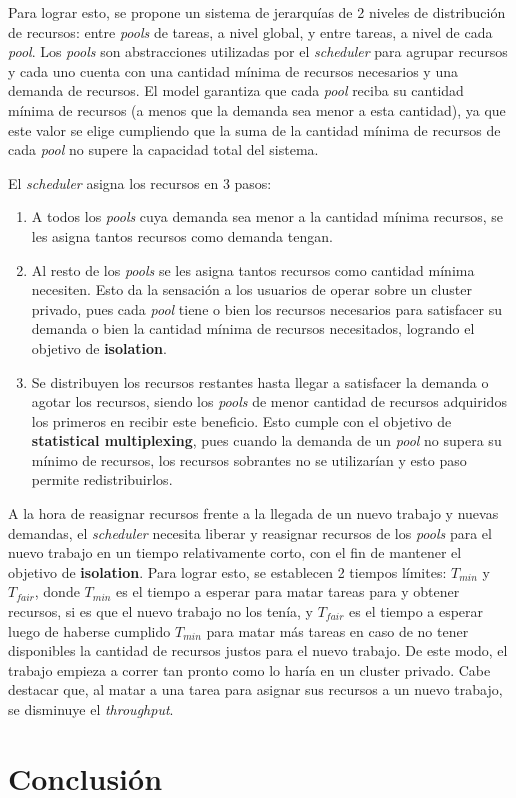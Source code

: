 \documentclass[a4paper]{article}
\begin{document}
Para lograr esto, se propone un sistema de jerarquías de 2 niveles de
distribución de recursos: entre \textit{pools} de tareas, a nivel global, y
entre tareas, a nivel de cada \textit{pool}. Los \textit{pools} son
abstracciones utilizadas por el \textit{scheduler} para agrupar recursos y cada
uno cuenta con una cantidad mínima de recursos necesarios y una demanda de
recursos. El model garantiza que cada \textit{pool} reciba su cantidad mínima
de recursos (a menos que la demanda sea menor a esta cantidad), ya que este
valor se elige cumpliendo que la suma de la cantidad mínima de recursos de cada
\textit{pool} no supere la capacidad total del sistema.

El \textit{scheduler} asigna los recursos en 3 pasos:
\begin{enumerate}
	\item A todos los \textit{pools} cuya demanda sea menor a la cantidad mínima
  recursos, se les asigna tantos recursos como demanda tengan.
	\item Al resto de los \textit{pools} se les asigna tantos recursos como
  cantidad mínima necesiten. Esto da la sensación a los usuarios de operar
  sobre un cluster privado, pues cada \textit{pool} tiene o bien los recursos
  necesarios para satisfacer su demanda o bien la cantidad mínima de recursos
  necesitados, logrando el objetivo de \textbf{isolation}.
	\item Se distribuyen los recursos restantes hasta llegar a satisfacer la
  demanda o agotar los recursos, siendo los \textit{pools} de menor cantidad de
  recursos adquiridos los primeros en recibir este beneficio. Esto cumple con
  el objetivo de \textbf{statistical multiplexing}, pues cuando la demanda de
  un \textit{pool} no supera su mínimo de recursos, los recursos sobrantes no
  se utilizarían y esto paso permite redistribuirlos.
\end{enumerate}

A la hora de reasignar recursos frente a la llegada de un nuevo trabajo y
nuevas demandas, el \textit{scheduler} necesita liberar y reasignar recursos de
los \textit{pools} para el nuevo trabajo en un tiempo relativamente corto, con
el fin de mantener el objetivo de \textbf{isolation}. Para lograr esto, se
establecen 2 tiempos límites: $T_{min}$ y $T_{fair}$, donde $T_{min}$ es el
tiempo a esperar para matar tareas para y obtener recursos, si es que el nuevo
trabajo no los tenía, y $T_{fair}$ es el tiempo a esperar luego de haberse
cumplido $T_{min}$ para matar más tareas en caso de no tener disponibles la
cantidad de recursos justos para el nuevo trabajo. De este modo, el trabajo
empieza a correr tan pronto como lo haría en un cluster privado. Cabe destacar
que, al matar a una tarea para asignar sus recursos a un nuevo trabajo, se
disminuye el \textit{throughput}.



\newpage
\section{Conclusión}
\end{document}
